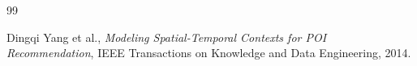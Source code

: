\documentclass[11pt, a4paper]{article}
\begin{document}

\begin{thebibliography}{99}

Dingqi Yang et al., 
\textit{Modeling Spatial-Temporal Contexts for POI Recommendation},
IEEE Transactions on Knowledge and Data Engineering, 2014.


\end{thebibliography}
\end{document}
